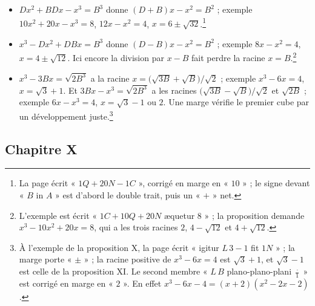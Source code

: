 \documentclass[11pt,a4paper]{article}
\begin{document}
\begin{itemize}
{    corrigé en « $D$ » à la proposition VI.}
  \item $Dx^2 + BDx - x^3 = B^3$ donne $(D + B)x - x^2 = B^2$ ; exemple
    $10x^2 + 20x - x^3 = 8$, $12x - x^2 = 4$, $x = 6 \pm \sqrt{32}$.\footnote{La page
    écrit « $1Q + 20N - 1C$ », corrigé en marge en « $10$ » ; le signe devant
    « $B$ in $A$ » est d'abord le double trait, puis un « $+$ » net.}
  \item $x^3 - Dx^2 + DBx = B^3$ donne $(D - B)x - x^2 = B^2$ ; exemple
    $8x - x^2 = 4$, $x = 4 \pm \sqrt{12}$. Ici encore la division par $x - B$ fait
    perdre la racine $x = B$.\footnote{L'exemple est écrit « $1C + 10Q + 20N$
    æquetur $8$ » ; la proposition demande $x^3 - 10x^2 + 20x = 8$, qui a les trois
    racines $2$, $4 - \sqrt{12}$ et $4 + \sqrt{12}$.}
  \item $x^3 - 3Bx = \sqrt{2B^3}$ a la racine $x = \bigl(\sqrt{3B} + \sqrt B\bigr)/\sqrt2$ ;
    exemple $x^3 - 6x = 4$, $x = \sqrt3 + 1$. Et $3Bx - x^3 = \sqrt{2B^3}$ a les
    racines $\bigl(\sqrt{3B} - \sqrt B\bigr)/\sqrt2$ et $\sqrt{2B}$ ; exemple
    $6x - x^3 = 4$, $x = \sqrt3 - 1$ ou $2$. Une marge vérifie le premier cube par
    un développement juste.\footnote{À l'exemple de la proposition X, la page
    écrit « igitur $L\,3 - 1$ fit $1N$ » ; la marge porte « $\pm$ » ; la racine positive
    de $x^3 - 6x = 4$ est $\sqrt3 + 1$, et $\sqrt3 - 1$ est celle de la
    proposition XI. Le second membre « $L\,B$ plano-plano-plani $\frac{\cdot}{1}$ » est
    corrigé en marge en « $2$ ». En effet $x^3 - 6x - 4 = (x + 2)(x^2 - 2x - 2)$.}
\end{itemize}

\subsection*{Chapitre X}
\end{document}
